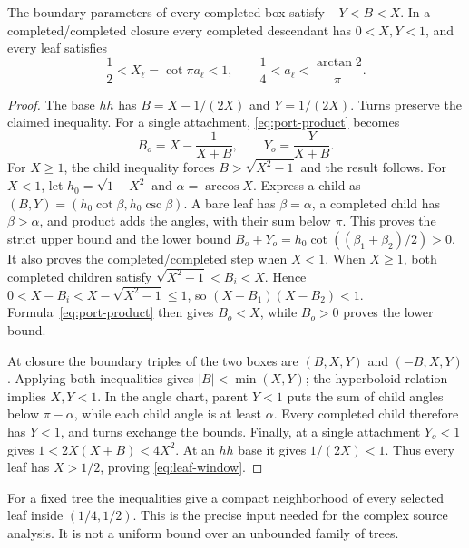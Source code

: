 \begin{lemma}\label{lem:port-bounds}
The boundary parameters of every completed box satisfy $-Y<B<X$. In a completed/completed closure every completed descendant has $0<X,Y<1$, and every leaf satisfies
\begin{equation}\label{eq:leaf-window}
 \frac12<X_\ell=\cot\pi a_\ell<1,
 \qquad \frac14<a_\ell<\frac{\arctan2}{\pi}.
\end{equation}
\end{lemma}
\begin{proof}
The base $hh$ has $B=X-1/(2X)$ and $Y=1/(2X)$. Turns preserve the claimed inequality. For a single attachment, \eqref{eq:port-product} becomes
\[
 B_o=X-\frac1{X+B},\qquad Y_o=\frac{Y}{X+B}.
\]
For $X\ge1$, the child inequality forces $B>\sqrt{X^2-1}$ and the result follows. For $X<1$, let $h_0=\sqrt{1-X^2}$ and $\alpha=\arccos X$. Express a child as $(B,Y)=(h_0\cot\beta,h_0\csc\beta)$. A bare leaf has $\beta=\alpha$, a completed child has $\beta>\alpha$, and product adds the angles, with their sum below $\pi$. This proves the strict upper bound and the lower bound $B_o+Y_o=h_0\cot((\beta_1+\beta_2)/2)>0$. It also proves the completed/completed step when $X<1$. When $X\ge1$, both completed children satisfy $\sqrt{X^2-1}<B_i<X$. Hence $0<X-B_i<X-\sqrt{X^2-1}\le1$, so $(X-B_1)(X-B_2)<1$. Formula~\eqref{eq:port-product} then gives $B_o<X$, while $B_o>0$ proves the lower bound.

At closure the boundary triples of the two boxes are $(B,X,Y)$ and $(-B,X,Y)$. Applying both inequalities gives $|B|<\min(X,Y)$; the hyperboloid relation implies $X,Y<1$. In the angle chart, parent $Y<1$ puts the sum of child angles below $\pi-\alpha$, while each child angle is at least $\alpha$. Every completed child therefore has $Y<1$, and turns exchange the bounds. Finally, at a single attachment $Y_o<1$ gives
$1<2X(X+B)<4X^2$. At an $hh$ base it gives $1/(2X)<1$. Thus every leaf has $X>1/2$, proving \eqref{eq:leaf-window}.
\end{proof}

For a fixed tree the inequalities give a compact neighborhood of every selected leaf inside $(1/4,1/2)$. This is the precise input needed for the complex source analysis. It is not a uniform bound over an unbounded family of trees.
